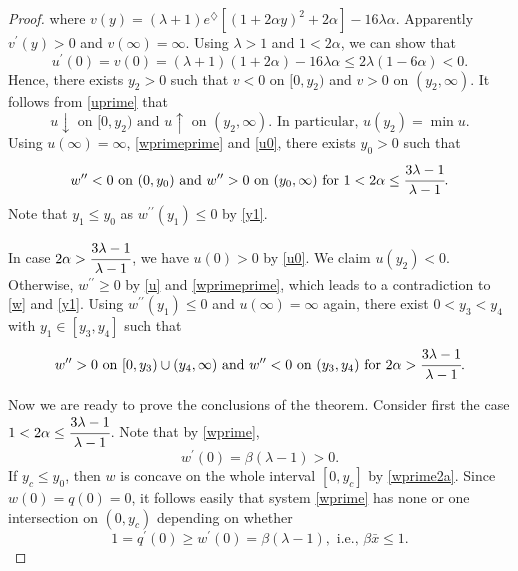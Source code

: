 \documentclass[11pt]{article}
\begin{document}
\begin{proof}
 where
$v(y)=(\lambda+1)e^\diamondsuit[(1+2\alpha
y)^2+2\alpha]-16\lambda\alpha .$ Apparently  $v^\prime(y)>0$ and
$v(\infty)= \infty$.  Using $\lambda >1$ and $1<2\alpha$, we can
show that
$$
u^\prime(0)=v(0)=  (\lambda+1)(1 +2\alpha)-16\lambda\alpha  \leq 2
\lambda (1-6 \alpha )< 0.
$$
Hence, there exists $y_2 >0$ such that $v<0$ on $[0, y_2)$ and
$v>0$ on $(y_2, \infty)$. It follows from \eqref{uprime} that
\begin{equation}\label{u}
 u \downarrow  \mbox{ on }[0, y_2) \mbox{ and } u \uparrow   \mbox{ on } (y_2, \infty).
 \mbox{ In particular, }  u(y_2)= \min u.
 \end{equation}
 Using $u(\infty)= \infty$, \eqref{wprimeprime} and \eqref{u0},   there exists $y_0>0$ such that
  \begin{equation}\label{wprime2a}
 w^{\prime\prime} <0 \mbox{ on } (0, y_0) \mbox{ and } w^{\prime\prime} >0    \mbox{ on } (y_0, \infty) \mbox{ for }
 1< 2\alpha \leq \cfrac{3\lambda-1}{\lambda-1}.
 \end{equation}
Note that $y_1 \leq y_0$ as $ w^{\prime\prime}(y_1) \leq 0$ by \eqref{y1}.

In case $2\alpha >\cfrac{3\lambda-1}{\lambda-1}$, we have $u(0)> 0
$ by \eqref{u0}. We claim $u(y_2)<0$. Otherwise, $
w^{\prime\prime} \geq 0$ by \eqref{u} and \eqref{wprimeprime},
which leads to a contradiction to \eqref{w} and \eqref{y1}.
 Using $ w^{\prime\prime}(y_1) \leq 0$ and $u(\infty)= \infty$ again, there exist $0< y_3 < y_4$ with $y_1 \in [y_3, y_4]$ such that
\begin{equation}\label{wprime2b}
 w^{\prime\prime} >0 \mbox{ on } [0, y_3) \cup (y_4, \infty) \mbox{ and } w^{\prime\prime} <0    \mbox{ on } (y_3, y_4)
 \mbox{ for }  2\alpha > \cfrac{3\lambda-1}{\lambda-1}.
\end{equation}


Now we are ready to prove the conclusions of the theorem. Consider
first the case $1< 2\alpha \leq \cfrac{3\lambda-1}{\lambda-1}$.
Note that by \eqref{wprime},
\begin{equation}\label{wprime0}
w^\prime(0)=\beta(\lambda-1)>0.
\end{equation}
If $y_c \leq y_0$,  then $w$ is concave on the whole interval $[0,y_c]$ by \eqref{wprime2a}. Since $w(0)=q(0)=0$,
it follows easily that system \eqref{wprime} has none or one intersection on $(0,y_c)$ depending on whether
\begin{equation}\label{k}
 1=q^\prime(0)\geq w^\prime(0)=\beta(\lambda-1),  \mbox{ i.e., }  \beta \bar x \leq 1.
\end{equation}


\end{proof}
\end{document}
